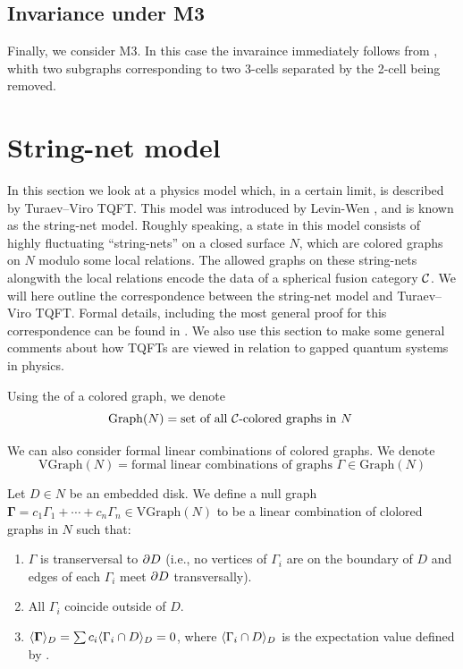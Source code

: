 \subsection*{Invariance under M3}
Finally, we consider M3. In this case the invaraince immediately follows
from , whith  two subgraphs corresponding to two 3-cells
separated by the 2-cell being removed.


\section{String-net model}\label{s:stringnet}


In this section we look at a physics model which, in a certain limit, is described 
by Turaev--Viro TQFT. This model was introduced  by Levin-Wen \cite{levin-wen}, 
and is known as the string-net model. Roughly speaking, a state in this model
consists of highly fluctuating ``string-nets'' on a closed surface $N$, which are  
colored graphs on $N$ modulo some local relations. The allowed graphs
on these string-nets alongwith the local relations encode the data of a spherical
fusion category $\mathcal{C}$.  We will here outline the correspondence between the string-net
 model and Turaev--Viro TQFT. Formal details, including the most
general proof for this correspondence can be found in \cite{kirillov-stringnet}. 
We also use this section to make some general comments about how TQFTs are viewed
in relation to gapped quantum systems in physics.


Using the  of a colored graph, we denote
  $$
\mathrm{Graph}(N)=\text{set of all $\mathcal{C}$-colored graphs in $N$ }
$$

We can also consider formal linear combinations of colored graphs. 
We denote
 $$
\mathrm{VGraph}(N)=\text{formal linear combinations of graphs }\Gamma \in \mathrm{Graph}(N) 
$$

\begin{definition}\label{d:null-graph}
	Let $D \in N$ be an embedded disk. We define a null graph $\boldsymbol{\Gamma} = c_1 \Gamma_1 + \cdots + c_n \Gamma_n 
	\in \mathrm{VGraph}(N)$ to be a linear combination of clolored graphs in $N$ such that:
	\begin{enumerate}
		\item $\Gamma$ is transerversal to $\partial D$ (i.e., no vertices of $\Gamma_i$ are on the boundary 
		of $D$ and edges of each $\Gamma_i$ meet $\partial D$ transversally).
		\item  All $\Gamma_i$ coincide outside of $D$.
		\item $\langle \boldsymbol{\Gamma} \rangle_D = \sum c_i \langle \Gamma_i \cap D \rangle_D =0$, where 
		$ \langle \Gamma_i \cap D \rangle_D$ is the expectation value defined by .
	\end{enumerate}
\end{definition}

